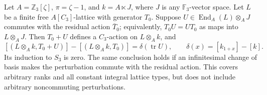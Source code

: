 \begin{proposition}
\label{C:shallow_commuting_trace}
Let $A=\mathbb Z_3[\zeta]$, $\pi=\zeta-1$, and
$k=A\ltimes J$, where $J$ is any $\mathbb F_3$-vector space.
Let $L$ be a finite free $A[C_3]$-lattice with generator $T_0$.
Suppose $U\in\operatorname{End}_A(L)\otimes_AJ$ commutes
with the residual action $\overline T_0$; equivalently,
$T_0U=UT_0$ as maps into $L\otimes_AJ$.
Then $T_0+U$ defines a $C_3$-action on $L\otimes_Ak$, and
\[
 [(L\otimes_Ak,T_0+U)]-[(L\otimes_Ak,T_0)]
       =\delta(\operatorname{tr}U),\qquad
 \delta(x)=[k_{1+x}]-[k].                              \tag{C.1.34}
\]
Its induction to $S_3$ is zero.
The same conclusion holds if an infinitesimal change of basis
makes the perturbation commute with the residual action.
This covers arbitrary ranks and all constant integral lattice
types, but does not include arbitrary noncommuting perturbations.
\end{proposition}
